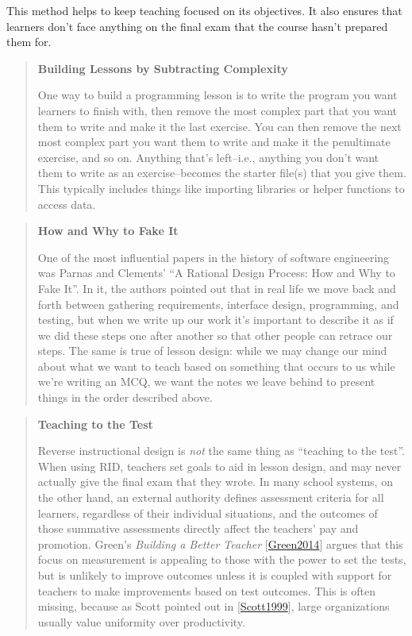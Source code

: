 \documentclass[10pt,statementpaper]{memoir}
\begin{document}
This method helps to keep teaching focused on its objectives. It also
ensures that learners don't face anything on the final exam that the
course hasn't prepared them for.

\begin{quote}
\textbf{Building Lessons by Subtracting Complexity}

One way to build a programming lesson is to write the program you want
learners to finish with, then remove the most complex part that you want
them to write and make it the last exercise. You can then remove the
next most complex part you want them to write and make it the
penultimate exercise, and so on. Anything that's left--i.e., anything
you don't want them to write as an exercise--becomes the starter file(s)
that you give them. This typically includes things like importing
libraries or helper functions to access data.
\end{quote}

\begin{quote}
\textbf{How and Why to Fake It}

One of the most influential papers in the history of software
engineering was Parnas and Clements' ``A Rational Design Process: How
and Why to Fake It''. In it, the authors pointed out that in real life
we move back and forth between gathering requirements, interface design,
programming, and testing, but when we write up our work it's important
to describe it as if we did these steps one after another so that other
people can retrace our steps. The same is true of lesson design: while
we may change our mind about what we want to teach based on something
that occurs to us while we're writing an MCQ, we want the notes we leave
behind to present things in the order described above.
\end{quote}

\begin{quote}
\textbf{Teaching to the Test}

Reverse instructional design is \emph{not} the same thing as ``teaching
to the test''. When using RID, teachers set goals to aid in lesson
design, and may never actually give the final exam that they wrote. In
many school systems, on the other hand, an external authority defines
assessment criteria for all learners, regardless of their individual
situations, and the outcomes of those summative assessments directly
affect the teachers' pay and promotion. Green's \emph{Building a Better
Teacher} {[}\href{biblio.html\#green-babt}{Green2014}{]} argues that
this focus on measurement is appealing to those with the power to set
the tests, but is unlikely to improve outcomes unless it is coupled with
support for teachers to make improvements based on test outcomes. This
is often missing, because as Scott pointed out in
{[}\href{biblio.html\#scott-state}{Scott1999}{]}, large organizations
usually value uniformity over productivity.
\end{quote}
\end{document}
